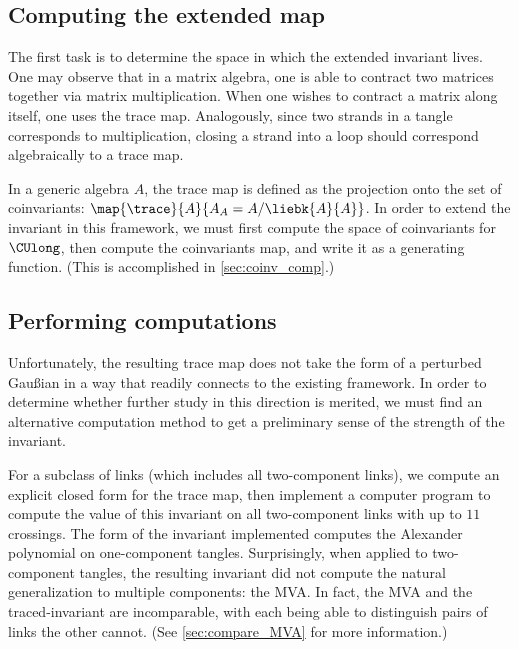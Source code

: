 \subsection{Computing the extended map}
The first task is to determine the space in which the extended invariant lives.
One may observe that in a matrix algebra, one is able to contract two matrices
together via matrix multiplication. When one wishes to contract a matrix along
itself, one uses the trace map. Analogously, since two strands in a tangle
corresponds to multiplication, closing a strand into a loop should correspond
algebraically to a trace map.

In a generic algebra $A$, the trace map is defined as the projection onto the
set of coinvariants: $\map {\trace} {A} {A_A = A/\liebk{A}{A}}$. In order to
extend the invariant in this framework, we must first compute the space of
coinvariants for $\CUlong$, then compute the coinvariants map, and write it as a
generating function. (This is accomplished in \cref{sec:coinv_comp}.)

\subsection{Performing computations}
Unfortunately, the resulting trace map does not take the form of a perturbed
Gaußian in a way that readily connects to the existing framework. In order to
determine whether further study in this direction is merited, we must find an
alternative computation method to get a preliminary sense of the strength of the
invariant.

For a subclass of links (which includes all two-component links), we compute an
explicit closed form for the trace map, then implement a computer program to
compute the value of this invariant on all two-component links with up to $11$
crossings. The form of the invariant implemented computes the Alexander
polynomial on one-component tangles. Surprisingly, when applied to two-component
tangles, the resulting invariant did not compute the natural generalization to
multiple components: the \ac{MVA}. In fact, the \ac{MVA} and the
traced-invariant are incomparable, with each being able to distinguish pairs of
links the other cannot. (See \cref{sec:compare_MVA} for more information.)
